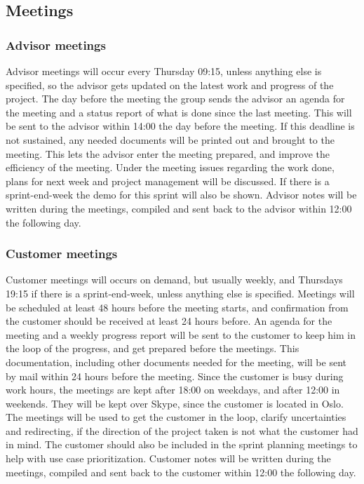 \subsection{Meetings}

\subsubsection{Advisor meetings}
Advisor meetings will occur every Thursday 09:15, unless anything else is specified, so the advisor gets updated on the latest work and progress of the project. The day before the meeting the group sends the advisor an agenda for the meeting and a status report of what is done since the last meeting. This will be sent to the advisor within 14:00 the day before the meeting. If this deadline is not sustained, any needed documents will be printed out and brought to the meeting. This lets the advisor enter the meeting prepared, and improve the efficiency of the meeting. Under the meeting issues regarding the work done, plans for next week and project management will be discussed. If there is a sprint-end-week the demo for this sprint will also be shown. Advisor notes will be written during the meetings, compiled and sent back to the advisor within 12:00 the following day.

\subsubsection{Customer meetings}
Customer meetings will occurs on demand, but usually weekly, and Thursdays 19:15 if there is a sprint-end-week, unless anything else is specified. Meetings will be scheduled at least 48 hours before the meeting starts, and confirmation from the customer should be received at least 24 hours before. An agenda for the meeting and a weekly progress report will be sent to the customer to keep him in the loop of the progress, and get prepared before the meetings. This documentation, including other documents needed for the meeting, will be sent by mail within 24 hours before the meeting. Since the customer is busy during work hours, the meetings are kept after 18:00 on weekdays, and after 12:00 in weekends. They will be kept over Skype, since the customer is located in Oslo. The meetings will be used to get the customer in the loop, clarify uncertainties and redirecting, if the direction of the project taken is not what the customer had in mind. The customer should also be included in the sprint planning meetings to help with use case prioritization. Customer notes will be written during the meetings, compiled and sent back to the customer within 12:00 the following day.

